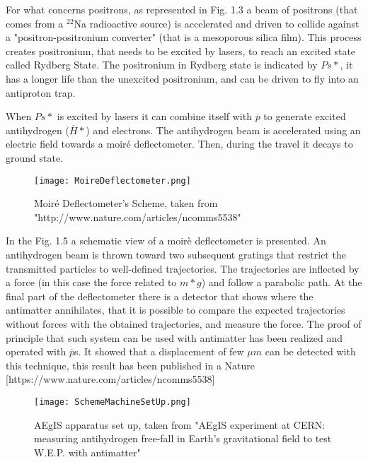 For what concerns positrons, as represented in Fig. 1.3 a beam of positrons (that comes from a $^{22}$Na radioactive source) is accelerated and driven to collide against a "positron-positronium converter" (that is a mesoporous silica film). This process creates positronium, that needs to be excited by lasers, to reach an excited state called Rydberg State. The positronium in Rydberg state is indicated by $ {Ps*} $, it has a longer life than the unexcited positronium, and can be driven to fly into an antiproton trap.


When $ {Ps*} $ is excited by lasers it can combine itself with $ \overline{p} $ to generate excited antihydrogen ($ \overline{H}* $) and electrons. The antihydrogen beam is accelerated using an electric field towards a moiré deflectometer. Then, during the travel it decays to ground state.  


\begin{figure}[H]
\centering
\texttt{[image: MoireDeflectometer.png]} 
\caption{Moiré Deflectometer's Scheme, taken from "http://www.nature.com/articles/ncomms5538" }
\end{figure}

In the Fig. 1.5 a schematic view of a moirè deflectometer is presented.
An antihydrogen beam is thrown toward two subsequent gratings that restrict the transmitted particles to well-defined trajectories. The trajectories are inflected by a force (in this case the force related to $ {m*g} $) and follow a parabolic path. At the final part of the deflectometer there is a detector that shows where the antimatter annihilates, that it is possible to compare the expected trajectories without forces with the obtained trajectories, and measure the force. The proof of principle that such system can be used with antimatter has been realized and operated with $ \overline{p} $s. It showed that a displacement of few $ \mu m $ can be detected with this technique, this result has been published in a Nature [https://www.nature.com/articles/ncomms5538]


\begin{figure}[H]
\centering
\texttt{[image: SchemeMachineSetUp.png]} 
\caption{AEgIS apparatus set up, taken from "AEgIS experiment at CERN: measuring antihydrogen free-fall in Earth’s gravitational field to test W.E.P. with antimatter" }
\end{figure}
